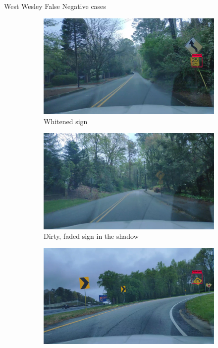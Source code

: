 \documentclass{beamer}
\begin{document}
\begin{frame}{West Wesley False Negative cases}
    \begin{figure}
      \begin{center}
        \begin{subfigure}[t]{.49\linewidth}
          \centering
          \includegraphics[width=0.99\linewidth]{figures/examples/westwestley/FN/FN01.jpg}
          \caption{Whitened sign}
          \label{fig:wwWhiteFN}
        \end{subfigure}
        \begin{subfigure}[t]{.49\linewidth}
          \centering
          \includegraphics[width=0.99\linewidth]{figures/examples/westwestley/FN/FN02.jpg}
          \caption{Dirty, faded sign in the shadow}
          \label{fig:wwFaddedFN}
        \end{subfigure}
        \begin{subfigure}[t]{.49\linewidth}
          \centering
          \includegraphics[width=0.99\linewidth]{figures/examples/westwestley/FN/FN03.png}

\end{subfigure}
\end{center}
\end{figure}
\end{frame}
\end{document}
